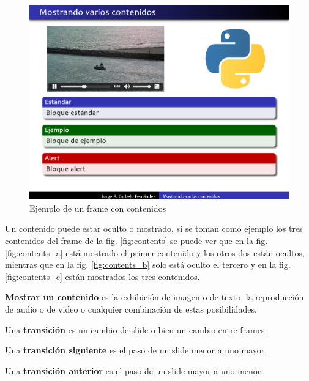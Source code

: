  		\begin{figure}[tb]
 			\centering
 			\includegraphics[width=12cm]{img/frame-video-image}
 			\caption{Ejemplo de un frame con contenidos}
 			\label{fig:frame_video_image}
 		\end{figure}

 		Un contenido puede estar oculto o mostrado, si se toman como ejemplo los tres contenidos del frame de la fig. \ref{fig:contents} se puede ver que en la fig. \ref{fig:contents_a} está mostrado el primer contenido y los otros dos están ocultos, mientras que en la fig. \ref{fig:contents_b} solo está oculto el tercero y en la fig. \ref{fig:contents_c} están mostrados los tres contenidos.		

		\begin{definition}
		\label{def:show}
			\textbf{Mostrar un contenido} es la exhibición de imagen o de texto, la reproducción de audio o de video o cualquier combinación de estas posibilidades.
		\end{definition} 		


 		\begin{definition}
 		\label{def:transition}
 			Una \textbf{transición} es un cambio de slide o bien un cambio entre frames.
 		\end{definition}

 		\begin{definition}
 		\label{def:next_transition}
 			Una \textbf{transición siguiente} es el paso de un slide menor a uno mayor.
 		\end{definition} 		

 		\begin{definition}
 		\label{def:prev_transition}
 			Una \textbf{transición anterior} es el paso de un slide mayor a uno menor.
 		\end{definition}

